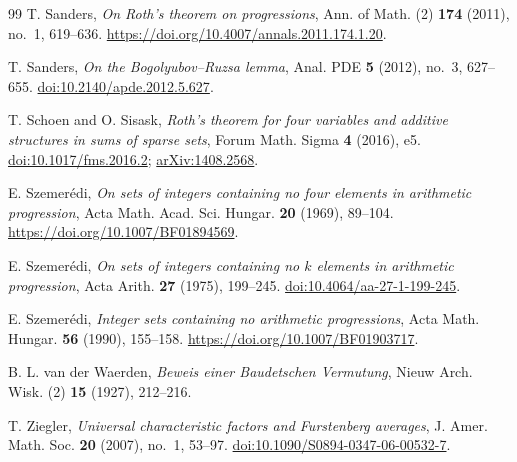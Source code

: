 \begin{thebibliography}{99}
T. Sanders, \emph{On Roth's theorem on progressions},
Ann. of Math. (2) \textbf{174} (2011), no.~1, 619--636.
\url{https://doi.org/10.4007/annals.2011.174.1.20}.

T. Sanders, \emph{On the Bogolyubov--Ruzsa lemma},
Anal. PDE \textbf{5} (2012), no.~3, 627--655.
\href{https://doi.org/10.2140/apde.2012.5.627}{doi:10.2140/apde.2012.5.627}.

T. Schoen and O. Sisask, \emph{Roth's theorem for four variables and additive structures in sums of sparse sets},
Forum Math. Sigma \textbf{4} (2016), e5.
\href{https://doi.org/10.1017/fms.2016.2}{doi:10.1017/fms.2016.2};
\href{https://arxiv.org/abs/1408.2568}{arXiv:1408.2568}.

E. Szemer\'edi, \emph{On sets of integers containing no four elements in
arithmetic progression}, Acta Math. Acad. Sci. Hungar. \textbf{20} (1969),
89--104. \url{https://doi.org/10.1007/BF01894569}.

E. Szemer\'edi, \emph{On sets of integers containing no $k$ elements in arithmetic progression},
Acta Arith. \textbf{27} (1975), 199--245.
\href{https://doi.org/10.4064/aa-27-1-199-245}{doi:10.4064/aa-27-1-199-245}.

E. Szemer\'edi, \emph{Integer sets containing no arithmetic progressions},
Acta Math. Hungar. \textbf{56} (1990), 155--158.
\url{https://doi.org/10.1007/BF01903717}.

B. L. van der Waerden, \emph{Beweis einer Baudetschen Vermutung},
Nieuw Arch. Wisk. (2) \textbf{15} (1927), 212--216.

T. Ziegler, \emph{Universal characteristic factors and Furstenberg averages},
J. Amer. Math. Soc. \textbf{20} (2007), no.~1, 53--97.
\href{https://doi.org/10.1090/S0894-0347-06-00532-7}{doi:10.1090/S0894-0347-06-00532-7}.

\end{thebibliography}
